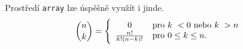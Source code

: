 \documentclass[a4paper, 11pt, twocolumn]{article}
\theoremstyle{definition}
\theoremstyle{plain}
\begin{document}
    Prostředí \texttt{array} lze úspěšně využít i jinde.
    \begin{equation*}
        \dbinom{n}{k}  = \Bigg\lbrace
        \begin{array}{c l}
            0 & \textrm{pro } k~< 0 \textrm{ nebo } k~> n \\
            \frac{n!}{k!(n-k)!} & \textrm{pro } 0 \leq k \leq n.
        \end{array}
    \end{equation*}
\end{document}
